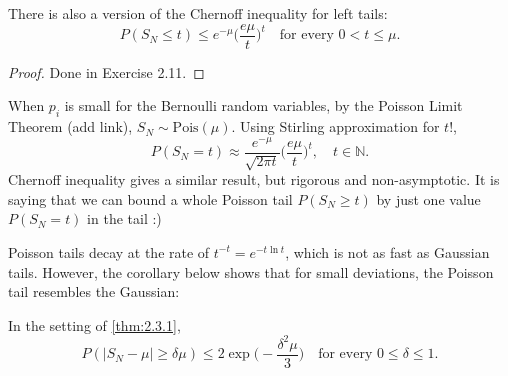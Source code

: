 \begin{remark}
\label{rmk:2.3.2}
There is also a version of the Chernoff inequality for left tails: 
\[ P(S_N \leq t) \leq e^{-\mu} \biggl( \frac{e \mu}{t} \biggr)^t \quad \text{for every } 
0 < t \leq \mu. \]
\end{remark}

\begin{proof}
Done in Exercise 2.11.
\end{proof}

\begin{remark}
\label{rmk:2.3.3}
When $p_i$ is small for the Bernoulli random variables, by the Poisson Limit Theorem (add link), 
$S_N \sim \text{Pois}(\mu)$. Using Stirling approximation for $t!$, 
\[ P(S_N = t) \approx \frac{e^{-\mu}}{\sqrt{2 \pi t}} \biggl( \frac{e \mu}{t} \biggr)^t, 
\quad t \in \mathbb{N}. \]
Chernoff inequality gives a similar result, but rigorous and non-asymptotic. It is saying that we can 
bound a whole Poisson tail $P(S_N \geq t)$ by just one value $P(S_N = t)$ in the tail :)
\end{remark}

Poisson tails decay at the rate of $t^{-t} = e^{-t \ln{t}}$, which is not as fast as Gaussian tails. 
However, the corollary below shows that for small deviations, the Poisson tail resembles the Gaussian: 
\begin{corollary}
\label{cor:2.3.4}
In the setting of \cref{thm:2.3.1}, 
\[ P(|S_N - \mu| \geq \delta \mu) \leq 2 \exp{\biggl( -\frac{\delta^2 \mu}{3} \biggr)} \quad 
\text{for every } 0 \leq \delta \leq 1. \]
\end{corollary}

